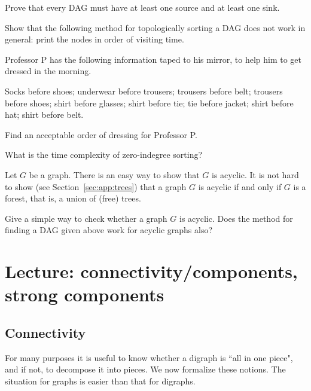 \begin{Exercise}
\label{ex:DAG-sink}
Prove that every DAG must have at least one source and at least one sink.
\end{Exercise}

\begin{Exercise}
\label{ex:sillytopsort}
Show that the following method for topologically sorting a DAG does not work in 
general: print the nodes in order of visiting time.
\end{Exercise}

\begin{Exercise} 
\label{ex:profP}
Professor P has the following information taped to his mirror, to help
him to get dressed in the morning.

Socks before shoes; underwear before trousers; trousers before belt;
trousers before shoes; shirt before glasses; shirt before tie; tie
before jacket; shirt before hat; shirt before belt.

Find an acceptable order of dressing for Professor P.
\end{Exercise}

\begin{Exercise}
\label{ex:zero-indeg-runtime}
What is the time complexity of zero-indegree sorting? 
\end{Exercise}


\begin{Exercise}
\label{ex:forest}
Let $G$ be a graph. There is an easy way to show that $G$ is acyclic.
It is not hard to show (see Section~\ref{sec:app:trees}) that a graph $G$ is 
acyclic if and only if $G$ is a forest, that is, a union of (free) trees.

Give a simple way to check whether a graph $G$ is acyclic. Does the method 
for finding a DAG given above work for acyclic graphs also?
\end{Exercise}

\chapter{Lecture: connectivity/components, strong components}

\section{Connectivity}
\label{sec:connectivity}

For many purposes it is useful to know whether a digraph is ``all in one
piece", and if not, to decompose it into pieces. We now formalize these
notions. The situation for graphs is easier than that for digraphs.

